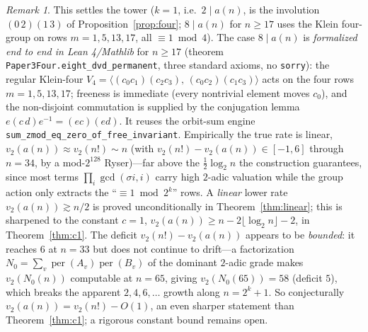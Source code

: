 \documentclass[11pt]{article}
\theoremstyle{remark}\newtheorem{remark}[theorem]{Remark}
\DeclareMathOperator{\perm}{per}
\begin{document}
\begin{remark}
This settles the tower ($k=1$, i.e.\ $2\mid a(n)$, is the involution
$(0\,2)(1\,3)$ of Proposition~\ref{prop:four}; $8\mid a(n)$ for $n\ge17$ uses the
Klein four-group on rows $m=1,5,13,17$, all $\equiv1\bmod4$). The case
$8\mid a(n)$ is \emph{formalized end to end in Lean 4/Mathlib} for $n\ge17$
(theorem \texttt{Paper3Four.eight\_dvd\_permanent}, three standard axioms, no
\texttt{sorry}): the regular Klein-four
$V_4=\langle(c_0c_1)(c_2c_3),\,(c_0c_2)(c_1c_3)\rangle$ acts on the four rows
$m=1,5,13,17$; freeness is immediate (every nontrivial element moves $c_0$), and the
non-disjoint commutation is supplied by the conjugation lemma $e(c\,d)e^{-1}=(ec)(ed)$.
It reuses the orbit-sum engine \texttt{sum\_zmod\_eq\_zero\_of\_free\_invariant}.
Empirically the true
rate is linear, $v_2(a(n))\approx v_2(n!)\sim n$ (with $v_2(n!)-v_2(a(n))\in[-1,6]$ through $n=34$, by
a mod-$2^{128}$ Ryser)---far above the $\tfrac12\log_2 n$ the construction
guarantees, since most terms $\prod_i\gcd(\sigma i,i)$ carry high $2$-adic
valuation while the group action only extracts the ``$\equiv1\bmod 2^k$'' rows.
A \emph{linear} lower rate $v_2(a(n))\gtrsim n/2$ is proved unconditionally in
Theorem~\ref{thm:linear}; this is sharpened to the constant $c=1$,
$v_2(a(n))\ge n-2\lfloor\log_2 n\rfloor-2$, in Theorem~\ref{thm:c1}. The deficit
$v_2(n!)-v_2(a(n))$ appears to be \emph{bounded}: it reaches $6$ at $n=33$ but does not continue
to drift---a factorization $N_0=\sum_v \perm(A_v)\perm(B_v)$ of the dominant $2$-adic grade makes
$v_2(N_0(n))$ computable at $n=65$, giving $v_2(N_0(65))=58$ (deficit $5$), which breaks the
apparent $2,4,6,\dots$ growth along $n=2^k+1$. So conjecturally $v_2(a(n))=v_2(n!)-O(1)$, an even
sharper statement than Theorem~\ref{thm:c1}; a rigorous constant bound remains open.
\end{remark}
\end{document}
